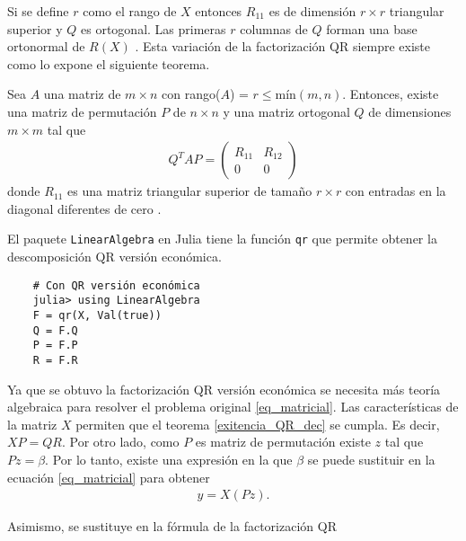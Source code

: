 Si se define $r$ como el rango de $X$ entonces $R_{11}$ es de dimensión $r \times r$ triangular superior y $Q$ es ortogonal. Las primeras $r$ columnas de $Q$ forman una base ortonormal de $R(X)$ \citep{numerical_linear_algebra}. Esta variación de la factorización QR siempre existe como lo expone el siguiente teorema.

\begin{theorem} \label{exitencia_QR_dec}
Sea $A$ una matriz de $m \times n$ con rango($A$) = $r \leq \text{mín} (m, n)$. Entonces, existe una matriz de permutación $P$ de $n \times n$ y una matriz ortogonal $Q$ de dimensiones $m \times m$ tal que 
\begin{equation*}
\begin{aligned}
Q^{T}AP = 
\begin{pmatrix}
R_{11} & R_{12} \\
   0      & 0
\end{pmatrix}
\end{aligned}
\end{equation*}
donde $R_{11}$ es una matriz triangular superior de tamaño $r \times r$ con entradas en la diagonal diferentes de cero \cite[p.~532]{numerical_linear_algebra}.
\end{theorem}

El paquete \texttt{LinearAlgebra} \citep{Julia-2017} en \textsf{Julia} tiene la función \texttt{qr} que permite obtener la descomposición QR versión económica.  

\begin{verbatim}
    # Con QR versión económica
    julia> using LinearAlgebra
    F = qr(X, Val(true))
    Q = F.Q
    P = F.P
    R = F.R
\end{verbatim}

Ya que se obtuvo la factorización QR versión económica se necesita más teoría algebraica para resolver el problema original \ref{eq_matricial}. Las características de la matriz $X$ permiten que el teorema \ref{exitencia_QR_dec} se cumpla. Es decir, $XP = QR$. Por otro lado, como $P$ es matriz de permutación existe $z$ tal que $Pz = \beta$. Por lo tanto, existe una expresión en la que $\beta$ se puede sustituir en la ecuación \ref{eq_matricial} para obtener 
\begin{equation*}
    \begin{aligned}
    y = X (Pz) . 
    \end{aligned}
\end{equation*}

\noindent Asimismo, se sustituye en la fórmula de la factorización QR

